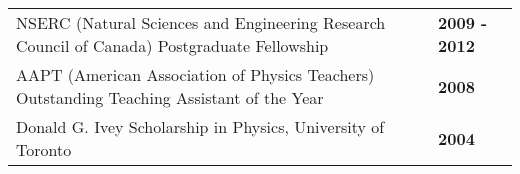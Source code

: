 \documentclass[margin,line]{res}
\begin{document}
\begin{resume}
\begin{tabular}{@{}p{4.5in}p{1.37in}}
NSERC (Natural Sciences and Engineering Research Council of Canada) Postgraduate Fellowship &  \hfill {\bf 2009 - 2012}\\
AAPT (American Association of Physics Teachers) Outstanding Teaching Assistant of the Year  &  \hfill {\bf 2008}\\
Donald G. Ivey Scholarship in Physics, University of Toronto & \hfill {\bf 2004}\\

\end{tabular}

%
%
%






\end{resume}
\end{document}
